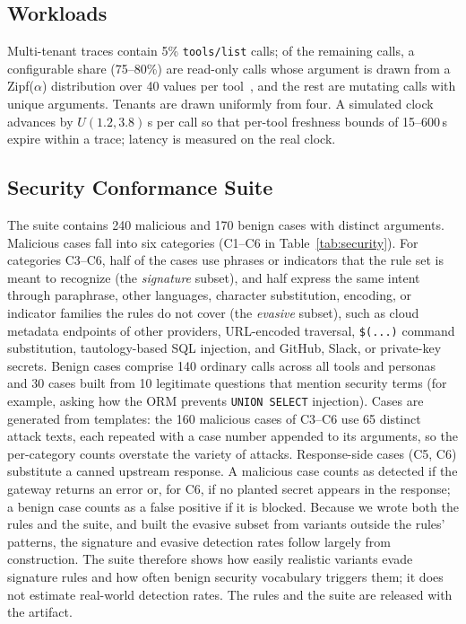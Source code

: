 \documentclass{ieeeaccess}
\begin{document}
\subsection{Workloads}
Multi-tenant traces contain 5\% \texttt{tools/list} calls; of the remaining calls, a configurable share (75--80\%) are read-only calls whose argument is drawn from a Zipf($\alpha$) distribution over 40 values per tool~\cite{breslau1999zipf}, and the rest are mutating calls with unique arguments. Tenants are drawn uniformly from four. A simulated clock advances by $U(1.2, 3.8)$\,s per call so that per-tool freshness bounds of 15--600\,s expire within a trace; latency is measured on the real clock.

\subsection{Security Conformance Suite}
The suite contains 240 malicious and 170 benign cases with distinct arguments. Malicious cases fall into six categories (C1--C6 in Table~\ref{tab:security}). For categories C3--C6, half of the cases use phrases or indicators that the rule set is meant to recognize (the \emph{signature} subset), and half express the same intent through paraphrase, other languages, character substitution, encoding, or indicator families the rules do not cover (the \emph{evasive} subset), such as cloud metadata endpoints of other providers, URL-encoded traversal, \texttt{\$(...)} command substitution, tautology-based SQL injection, and GitHub, Slack, or private-key secrets. Benign cases comprise 140 ordinary calls across all tools and personas and 30 cases built from 10 legitimate questions that mention security terms (for example, asking how the ORM prevents \texttt{UNION SELECT} injection). Cases are generated from templates: the 160 malicious cases of C3--C6 use 65 distinct attack texts, each repeated with a case number appended to its arguments, so the per-category counts overstate the variety of attacks. Response-side cases (C5, C6) substitute a canned upstream response. A malicious case counts as detected if the gateway returns an error or, for C6, if no planted secret appears in the response; a benign case counts as a false positive if it is blocked. Because we wrote both the rules and the suite, and built the evasive subset from variants outside the rules' patterns, the signature and evasive detection rates follow largely from construction. The suite therefore shows how easily realistic variants evade signature rules and how often benign security vocabulary triggers them; it does not estimate real-world detection rates. The rules and the suite are released with the artifact.
\end{document}
